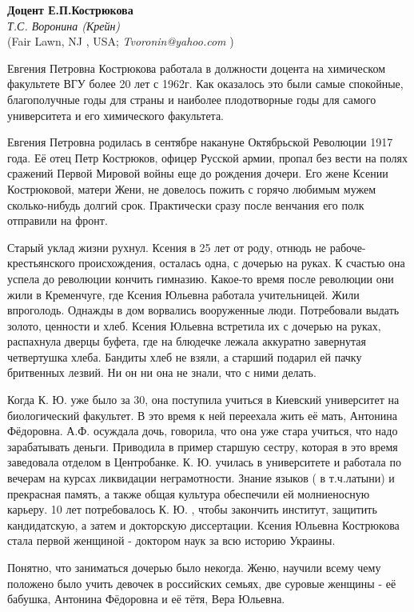 \begin{center}{ \bf Доцент Е.П.Кострюкова }\\
{\it Т.С. Воронина (Крейн)} \\
(Fair Lawn, NJ , USA; {\it Tvoronin@yahoo.com} )
\end{center}
Евгения Петровна Кострюкова работала в должности доцента на химическом факультете ВГУ более 20 лет с 1962г.
Как оказалось это были самые спокойные, благополучные годы для страны и наиболее плодотворные годы для самого университета и его химического факультета.

Евгения Петровна родилась в сентябре накануне Ок\-тяб\-рь\-с\-кой Революции 1917 года.
Её отец Петр Кострюков, офицер Русской армии, пропал без вести на полях сражений Первой Мировой войны еще до рождения дочери. Его жене Ксении Кострюковой, матери Жени, не довелось пожить с горячо любимым мужем сколько-нибудь долгий срок. Практически сразу после венчания его полк отправили на фронт.

Старый уклад жизни рухнул. Ксения в 25 лет от роду, отнюдь не рабоче-крестьянского происхождения, осталась одна, с дочерью на руках. К счастью она успела до революции кончить гимназию. Какое-то время после революции они жили в Кременчуге, где Ксения Юльевна работала учительницей. Жили впроголодь. Однажды в дом ворвались вооруженные люди. Потребовали выдать золото, ценности и хлеб. Ксения Юльевна встретила их с дочерью на руках, распахнула дверцы буфета, где на блюдечке лежала аккуратно завернутая четвертушка хлеба. Бандиты хлеб не взяли, а старший подарил ей пачку бритвенных лезвий. Ни он ни она не знали, что с ними делать.

Когда К. Ю. уже было за 30, она поступила учиться в Киевский университет на биологический факультет. В это время к ней переехала жить её мать, Антонина Фёдоровна. А.Ф. осуждала дочь, говорила, что она уже стара учиться, что надо зарабатывать деньги. Приводила в пример старшую сестру, которая в это время заведовала отделом в Центробанке. К. Ю. училась в университете и работала по вечерам на курсах ликвидации неграмотности. Знание языков ( в т.ч.латыни) и прекрасная память, а также общая культура обеспечили ей молниеносную карьеру. 10 лет потребовалось К. Ю. , чтобы закончить институт, защитить кандидатскую, а затем и докторскую диссертации. Ксения Юльевна Кострюкова стала первой женщиной - доктором наук за всю историю Украины.

Понятно, что заниматься дочерью было некогда. Женю, научили всему чему положено было учить девочек в российских семьях, две суровые женщины - её бабушка, Антонина Фёдоровна и её тётя, Вера Юльевна.

